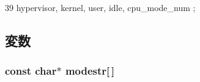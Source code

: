 \begin{DoxyCode}
39 { hypervisor, kernel, user, idle, cpu_mode_num };
\end{DoxyCode}


\subsection{変数}
\hypertarget{namespacePowerISA_1_1Kernel_aaab5092bc6d1c40a90ff4c7450649ace}{
\subsubsection[{modestr}]{\setlength{\rightskip}{0pt plus 5cm}const char$\ast$ {\bf modestr}\mbox{[}$\,$\mbox{]}}}
\label{namespacePowerISA_1_1Kernel_aaab5092bc6d1c40a90ff4c7450649ace}
